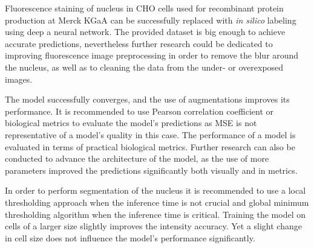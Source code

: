 Fluorescence staining of nucleus in CHO cells used for recombinant protein production at Merck KGaA can be successfully replaced with \textit{in silico} labeling using deep a neural network. The provided dataset is big enough to achieve accurate predictions, nevertheless further research could be dedicated to improving fluorescence image preprocessing in order to remove the blur around the nucleus, as well as to cleaning the data from the under- or overexposed images.

The model successfully converges, and the use of augmentations improves its performance. It is recommended to use Pearson correlation coefficient or biological metrics to evaluate the model's predictions as MSE is not representative of a model's quality in this case. The performance of a model is evaluated in terms of practical biological metrics. Further research can also be conducted to advance the architecture of the model, as the use of more parameters improved the predictions significantly both visually and in metrics.

In order to perform segmentation of the nucleus it is recommended to use a local thresholding approach when the inference time is not crucial and global minimum thresholding algorithm when the inference time is critical. Training the model on cells of a larger size slightly improves the intensity accuracy. Yet a slight change in cell size does not influence the model's performance significantly.
